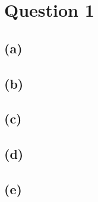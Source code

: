 \documentclass[class=article]{standalone}
\begin{document}
\section*{Question 1}
\subsection*{(a)}
\subsection*{(b)}
\subsection*{(c)}
\subsection*{(d)}
\subsection*{(e)}
\end{document}
